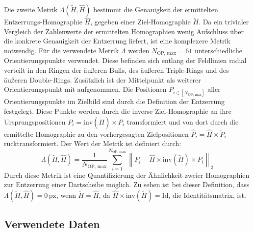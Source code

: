 Die zweite Metrik $\Lambda(\widetilde{H}, \widehat{H})$ bestimmt die Genauigkeit der ermittelten Entzerrungs-Homographie $\widehat{H}$, gegeben einer Ziel-Homographie $\widetilde{H}$. Da ein trivialer Vergleich der Zahlenwerte der ermittelten Homographien wenig Aufschluss über die konkrete Genauigkeit der Entzerrung liefert, ist eine komplexere Metrik notwendig. Für die verwendete Metrik $\Lambda$ werden $N_\text{OP, max}=61$ unterschiedliche Orientierungspunkte verwendet. Diese befinden sich entlang der Feldlinien radial verteilt in den Ringen der äußeren Bulls, des äußeren Triple-Rings und des äußeren Double-Rings. Zusätzlich ist der Mittelpunkt als weiterer Orientierungspunkt mit aufgenommen. Die Positionen $P_{i \in [N_\text{OP, max}]}$ aller Orientierungspunkte im Zielbild sind durch die Definition der Entzerrung festgelegt. Diese Punkte werden durch die inverse Ziel-Homographie an ihre Ursprungspositionen $\widetilde{P}_i = \mathrm{inv}(\widetilde{H}) \times P_i$ transformiert und von dort durch die ermittelte Homographie zu den vorhergesagten Zielpositionen $\widehat{P}_i = \widehat{H} \times \widetilde{P}_i$ rücktransformiert. Der Wert der Metrik ist definiert durch:
\[ \Lambda(\widetilde{H}, \widehat{H}) = \frac{1}{N_\text{OP, max}} \sum_{i = 1}^{N_\text{OP, max}} \left\lVert P_i - \widehat{H} \times \mathrm{inv}(\widetilde{H}) \times P_i \right\rVert _2  \]
Durch diese Metrik ist eine Quantifizierung der Ähnlichkeit zweier Homographien zur Entzerrung einer Dartscheibe möglich. Zu sehen ist bei dieser Definition, dass $\Lambda(\widetilde{H}, \widehat{H}) = 0\,\text{px}$, wenn $\widetilde{H} = \widehat{H}$, da $\widehat{H} \times \mathrm{inv}(\widetilde{H}) = \text{Id}$, die Identitätsmatrix, ist.


\vfill
\subsection{Verwendete Daten}
\label{sec:cv_ergebnisse_daten}

